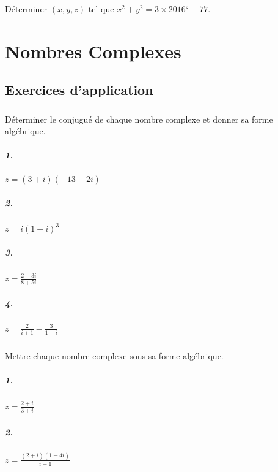 			Déterminer $(x,y,z)$ tel que $x^2 + y^2 = 3\times 2016^z + 77$.
	

\chapter{Nombres Complexes}

	\section{Exercices d'application}

		\subsection{}

			Déterminer le conjugué de chaque nombre complexe et donner sa forme algébrique.

			\paragraph{1.} $z=(3+i)(-13-2i)$
			\paragraph{2.} $z=i(1-i)^3$
			\paragraph{3.} $z=\frac{2-3i}{8+5i}$
			\paragraph{4.} $z=\frac{2}{i+1} - \frac{3}{1-i}$

		\subsection{}

			Mettre chaque nombre complexe sous sa forme algébrique.

			\paragraph{1.} $z=\frac{2+i}{3+i}$
			\paragraph{2.} $z=\frac{(2+i)(1-4i)}{i+1}$
		
		\subsection{}


